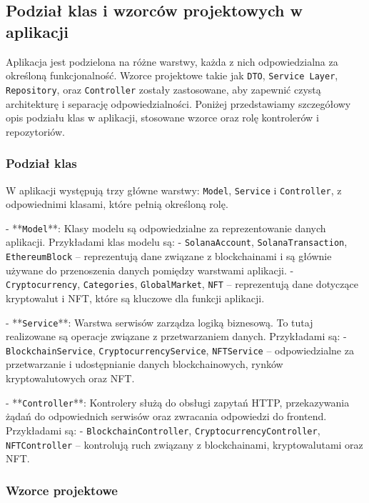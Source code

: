 \subsection{Podział klas i wzorców projektowych w aplikacji}

Aplikacja jest podzielona na różne warstwy, każda z nich odpowiedzialna za określoną funkcjonalność. Wzorce projektowe takie jak \texttt{DTO}, \texttt{Service Layer}, \texttt{Repository}, oraz \texttt{Controller} zostały zastosowane, aby zapewnić czystą architekturę i separację odpowiedzialności. Poniżej przedstawiamy szczegółowy opis podziału klas w aplikacji, stosowane wzorce oraz rolę kontrolerów i repozytoriów.

\subsubsection{Podział klas}

W aplikacji występują trzy główne warstwy: \texttt{Model}, \texttt{Service} i \texttt{Controller}, z odpowiednimi klasami, które pełnią określoną rolę.

- **\texttt{Model}**: Klasy modelu są odpowiedzialne za reprezentowanie danych aplikacji. Przykładami klas modelu są:
  - \texttt{SolanaAccount}, \texttt{SolanaTransaction}, \texttt{EthereumBlock} – reprezentują dane związane z blockchainami i są głównie używane do przenoszenia danych pomiędzy warstwami aplikacji.
  - \texttt{Cryptocurrency}, \texttt{Categories}, \texttt{GlobalMarket}, \texttt{NFT} – reprezentują dane dotyczące kryptowalut i NFT, które są kluczowe dla funkcji aplikacji.
  
- **\texttt{Service}**: Warstwa serwisów zarządza logiką biznesową. To tutaj realizowane są operacje związane z przetwarzaniem danych. Przykładami są:
  - \texttt{BlockchainService}, \texttt{CryptocurrencyService}, \texttt{NFTService} – odpowiedzialne za przetwarzanie i udostępnianie danych blockchainowych, rynków kryptowalutowych oraz NFT.
  
- **\texttt{Controller}**: Kontrolery służą do obsługi zapytań HTTP, przekazywania żądań do odpowiednich serwisów oraz zwracania odpowiedzi do frontend. Przykładami są:
  - \texttt{BlockchainController}, \texttt{CryptocurrencyController}, \texttt{NFTController} – kontrolują ruch związany z blockchainami, kryptowalutami oraz NFT.

\subsubsection{Wzorce projektowe}

